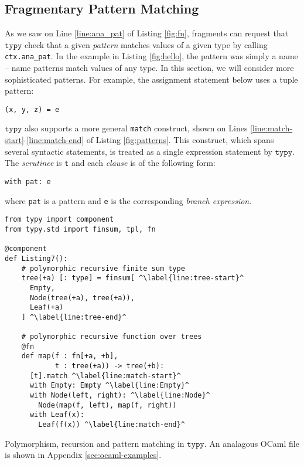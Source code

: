 \documentclass[preprint,10pt]{sigplanconf}
\newcommand{\typy}{\texttt{typy}}
\newcommand{\lip}[1]{\lstinline[language=Python,basicstyle=\ttfamily\footnotesize,deletendkeywords={tuple,buffer,map}]{#1}}
\newcommand{\li}[1]{\lip{#1}}
\begin{document}
\subsection{Fragmentary Pattern Matching}\label{sec:pattern-matching}
As we saw on Line \ref{line:ana_pat} of Listing \ref{fig:fn}, fragments can request that $\typy$ check that a given \emph{pattern} matches values of a given type by calling \li{ctx.ana_pat}. In the example in Listing \ref{fig:hello}, the pattern was simply a name -- name patterns match values of any type. In this section, we will consider more sophisticated patterns. For example, the assignment statement below uses a tuple pattern:
\begin{lstlisting}[numbers=none]
(x, y, z) = e
\end{lstlisting}

$\typy$ also supports a more general \li{match} construct, shown on Lines \ref{line:match-start}-\ref{line:match-end} of Listing \ref{fig:patterns}. This construct, which spans several syntactic statements, is treated as a single expression statement by $\typy$. The \emph{scrutinee} is \li{t} and each \emph{clause}  is of the following form:
\begin{lstlisting}[numbers=none]
with pat: e
\end{lstlisting}
where \li{pat} is a pattern and \li{e} is the corresponding \emph{branch expression}.

\begin{codelisting}[t]
\vspace{-3px}
\begin{lstlisting}
from typy import component
from typy.std import finsum, tpl, fn

@component
def Listing7():
    # polymorphic recursive finite sum type
    tree(+a) [: type] = finsum[ ^\label{line:tree-start}^
      Empty, 
      Node(tree(+a), tree(+a)),
      Leaf(+a)
    ] ^\label{line:tree-end}^

    # polymorphic recursive function over trees
    @fn
    def map(f : fn[+a, +b], 
            t : tree(+a)) -> tree(+b):
      [t].match ^\label{line:match-start}^
      with Empty: Empty ^\label{line:Empty}^
      with Node(left, right): ^\label{line:Node}^
        Node(map(f, left), map(f, right))
      with Leaf(x):
        Leaf(f(x)) ^\label{line:match-end}^
\end{lstlisting}
\caption{Polymorphism, recursion and pattern matching in $\typy$. An analagous OCaml file is shown in Appendix \ref{sec:ocaml-examples}.}
\label{fig:patterns}
\end{codelisting}
\end{document}
